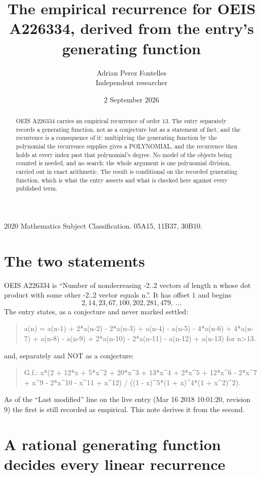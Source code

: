 \documentclass[11pt,a4paper]{article}
\title{The empirical recurrence for OEIS A226334, derived from the entry's generating function}
\author{Adrian Perez Fontelles\\ \small Independent researcher}
\date{2 September 2026}
\theoremstyle{plain}
\theoremstyle{definition}
\begin{document}
\maketitle

\begin{abstract}
OEIS A226334 carries an empirical recurrence of order $13$. The entry separately records a
generating function, not as a conjecture but as a statement of fact, and the recurrence is a
consequence of it: multiplying the generating function by the polynomial the recurrence
supplies gives a POLYNOMIAL, and the recurrence then holds at every index past that
polynomial's degree. No model of the objects being counted is needed, and no search: the
whole argument is one polynomial division, carried out in exact arithmetic. The result is
conditional on the recorded generating function, which is what the entry asserts and what is
checked here against every published term.
\end{abstract}

\noindent\small 2020 Mathematics Subject Classification. 05A15, 11B37, 30B10.\normalsize

\section{The two statements}

OEIS A226334 is ``Number of nondecreasing -2..2 vectors of length n whose dot product with some other -2..2 vector equals n.''. It has offset $1$ and begins
\[
2, 14, 23, 67, 100, 202, 281, 479,\ \dots
\]
The entry states, as a conjecture and never marked settled:
\begin{quote}
a(n) = a(n-1) + 2*a(n-2) - 2*a(n-3) + a(n-4) - a(n-5) - 4*a(n-6) + 4*a(n-7) + a(n-8) - a(n-9) + 2*a(n-10) - 2*a(n-11) - a(n-12) + a(n-13) for n>13.
\end{quote}
and, separately and NOT as a conjecture:
\begin{quote}
G.f.: x*(2 + 12*x + 5*x\^{}2 + 20*x\^{}3 + 13*x\^{}4 + 2*x\^{}5 + 12*x\^{}6 - 2*x\^{}7 + x\^{}9 - 2*x\^{}10 - x\^{}11 + x\^{}12) / ((1 - x)\^{}5*(1 + x)\^{}4*(1 + x\^{}2)\^{}2).
\end{quote}
As of the ``Last modified'' line on the live entry (Mar 16 2018 10:01:20, revision 9) the first is still
recorded as empirical. This note derives it from the second.

\section{A rational generating function decides every linear recurrence}
\end{document}
